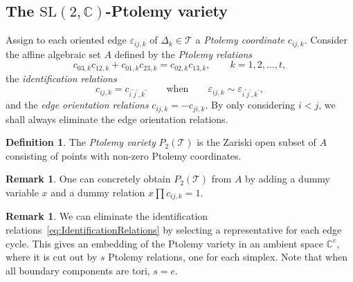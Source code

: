 \documentclass[12pt]{amsart}
\theoremstyle{definition}
\newtheorem{definition}[theorem]{Definition}
\newtheorem{remark}[theorem]{Remark}
\numberwithin{equation}{section}
\def\SL{\mathrm{SL}}
\def\C{\mathbb{C}}
\def\T{\mathcal{T}}
\begin{document}
\subsection{The $\SL(2,\C)$-Ptolemy variety}
Assign to each oriented edge $\varepsilon_{ij,k}$ of $\Delta_k\in \T$ a \emph{Ptolemy coordinate $c_{ij,k}$}. Consider the affine algebraic set $A$ defined by the \emph{Ptolemy relations}
\begin{equation}\label{eq:PtolemyRelationijk}
c_{03,k}c_{12,k}+c_{01,k}c_{23,k}=c_{02,k}c_{13,k}, \qquad k=1,2,\dots,t,
\end{equation}
the \emph{identification relations}
\begin{equation}\label{eq:IdentificationRelations}
c_{ij,k}=c_{i^\prime j^\prime,k^\prime}\qquad \text{when}\qquad \varepsilon_{ij,k}\sim\varepsilon_{i^\prime j^\prime,k^\prime},
\end{equation}
and the \emph{edge orientation relations} $c_{ij,k}=-c_{ji,k}$. By only considering $i<j$, we shall always eliminate the edge orientation relations.
\begin{definition}\label{def:PtolemyVariety} The \emph{Ptolemy variety} $P_2(\T)$ is the Zariski open subset of $A$ consisting of points with non-zero Ptolemy coordinates.
\end{definition}
\begin{remark} One can concretely obtain $P_2(\T)$ from $A$ by adding a dummy variable $x$ and a dummy relation $x\prod c_{ij,k}=1$.
\end{remark}

\begin{remark}\label{rm:PickRepresentative} We can eliminate the identification relations~\eqref{eq:IdentificationRelations} by selecting a representative for each edge cycle. This gives an embedding of the Ptolemy variety in an ambient space $\C^e$, where it is cut out by $s$ Ptolemy relations, one for each simplex. Note that when all boundary components are tori, $s=e$.
\end{remark}
\end{document}
